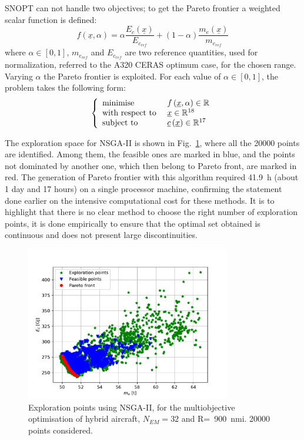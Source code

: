 SNOPT can not handle two objectives; to get the Pareto frontier a weighted scalar function is defined:
\begin{equation}
\label{eq:multiobj_aux_func}
f\left(\underline{x}, \alpha \right) = \alpha\frac{E_c\left(\underline{x}\right)}{E_{c_{ref}}} + \left(1-\alpha\right)\frac{m_e\left(\underline{x}\right)}{m_{e_{ref}}}
\end{equation}
where $\alpha\in[0,1]$, $m_{e_{ref}}$ and $E_{c_{ref}}$ are two reference quantities, used for normalization, referred to the A320 CERAS optimum case, for the chosen range. 
Varying $\alpha$ the Pareto frontier is exploited. 
For each value of $\alpha\in[0,1]$, the problem takes the following form:
\begin{equation*}
	\left\{\begin{array}{l l}
		\textrm{minimise } & f\left(\underline{x}, \alpha\right)\in\mathbb{R} \\
		\textrm{with respect to } & \underline{x}\in\mathbb{R}^{18} \\
		\textrm{subject to } & \underline{c}\left(\underline{x}\right)\in\mathbb{R}^{17} \\						 
	\end{array}\right.
\end{equation*}

The exploration space for NSGA-II is shown in Fig.~\ref{fig:hybrid_dep_pareto_exploration_point}, where all the 20000 points are identified.
Among them, the feasible ones are marked in blue, and the points not dominated by another one, which then belong to Pareto front, are marked in red. 
The generation of Pareto frontier with this algorithm required 41.9~\si{\hour} (about 1 day and 17 hours) on a single processor machine, confirming the statement done earlier on the intensive computational cost for these methods. 
It is to highlight that there is no clear method to choose the right number of exploration points, it is done empirically to ensure that the optimal set obtained is continuous and does not present large discontinuities.
\begin{figure}[!h]
	\centering
	\includegraphics[keepaspectratio, width=0.8\textwidth]{images/chap3/hybrid_dep_pareto_exploration_point}
	\caption{Exploration points using NSGA-II, for the multiobjective optimisation of hybrid aircraft, $N_{EM}=32$ and R=~900~nmi. 20000 points considered.}
	\label{fig:hybrid_dep_pareto_exploration_point}
\end{figure}

